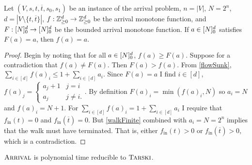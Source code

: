   \begin{lemma}
    Let $(V, s, t, \overline{t}, s_0, s_1)$ be an instance of the arrival problem, 
    $n = |V|$, $N = 2^n$, $d = |V \setminus \{t, \overline{t}\}|$, 
    $f : \mathbb{Z}_{\geq 0}^d \to \mathbb{Z}_{\geq 0}^d$ be the arrival monotone function, and $F : [N]_0^d \to [N]_0^d$
    be the bounded arrival monotone function.
    If $a \in [N]_0^d$ satisfies $F(a) = a$, then $f(a) = a$. 
  \end{lemma}
  \begin{proof}
    Begin by noting that for all $a \in [N]_0^d$, $f(a) \geq F(a)$. Suppose for a contradiction that $f(a) \neq F(a)$.
    Then $F(a) > f(a)$. From \cref{flowSunk},
    $\sum_{i \in [d]} f(a)_i \leq 1 + \sum_{i \in [d]} a_i$. 
    Since $F(a) = a$ I find $i \in [d]$, $f(a)_j = 
    \begin{cases} a_j + 1 & j = i \\ a_j & j \neq i. \end{cases}$. By definition $F(a)_i = \min(f(a)_i, N)$
      so $a_i = N$ and $f(a)_i = N + 1$.
    For $\sum_{i \in [d]} f(a)_i = 1 + \sum_{i \in [d]} a_i$ 
    I require that $f_{\text{in}}(t) = 0$ and $f_{\text{in}}(\overline{t}) = 0$.
    But \cref{walkFinite} combined with $a_i = N = 2^n$ implies that the walk must have terminated. That is,
    either $f_{\text{in}}(t) > 0$ or $f_{\text{in}}(\overline{t}) > 0$, which is a contradiction. 
  \end{proof}
  \begin{theorem}
    $\textsc{Arrival}$ is polynomial time reducible to $\textsc{Tarski}$.
  \end{theorem}
